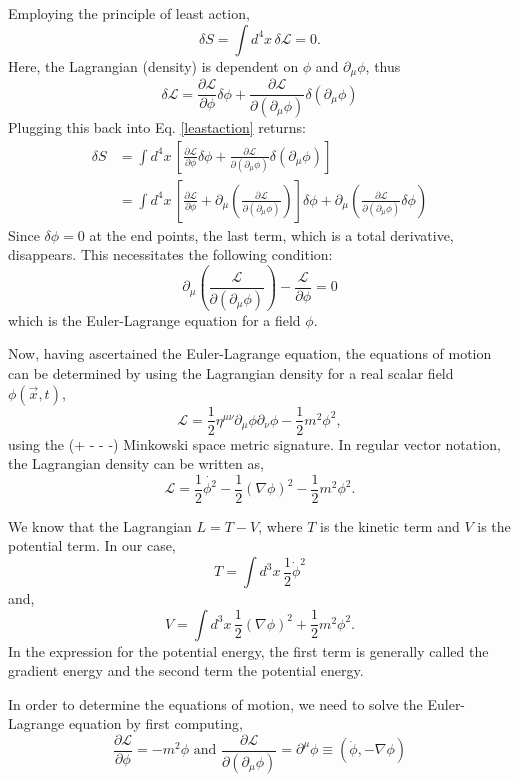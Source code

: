 \documentclass[12pt]{revtex4}
\begin{document}
Employing the principle of least action,
\begin{equation} \label{leastaction}
\delta S = \int d^4 x \, \delta \mathcal{L} = 0.
\end{equation}
Here, the Lagrangian (density) is dependent on $\phi$ and $\partial_{\mu} \phi$, thus
\[ \delta \mathcal{L} = \frac{\partial \mathcal{L}}{\partial \phi} \delta \phi + \frac{\partial \mathcal{L}}{\partial (\partial_{\mu} \phi)} \delta (\partial_{\mu} \phi)\]
Plugging this back into Eq. \ref{leastaction} returns:
\begin{align*}
\delta S &= \int d^4 x \, [\frac{\partial \mathcal{L}}{\partial \phi} \delta \phi + \frac{\partial \mathcal{L}}{\partial (\partial_{\mu} \phi)} \delta (\partial_{\mu} \phi)] \\
&= \int d^4 x \, [\frac{\partial \mathcal{L}}{\partial \phi} + \partial_{\mu}(\frac{\partial \mathcal{L}}{\partial (\partial_{\mu} \phi)})]\delta \phi + \partial_{\mu}(\frac{\partial \mathcal{L}}{\partial (\partial_{\mu} \phi)}\delta \phi)\end{align*} 
Since $\delta \phi = 0$ at the end points, the last term, which is a total derivative, disappears. This necessitates the following condition:
\[ \partial_{\mu}(\frac{\mathcal{L}}{\partial(\partial_{\mu}\phi)}) - \frac{\mathcal{L}}{\partial \phi} = 0\]
which is the Euler-Lagrange equation for a field $\phi$.

Now, having ascertained the Euler-Lagrange equation, the equations of motion can be determined by using the Lagrangian density for a real scalar field $\phi (\vec{x},t)$,
\[ \mathcal{L} = \dfrac{1}{2} \eta^{\mu\nu} \partial_{\mu} \phi \partial_{\nu} \phi - \dfrac{1}{2}m^2\phi^2,\]
using the (+ - - -) Minkowski space metric signature. In regular vector notation, the Lagrangian density can be written as,
\[ \mathcal{L} = \dfrac{1}{2} \dot{\phi^2} - \dfrac{1}{2}(\nabla \phi)^2 - \dfrac{1}{2}m^2\phi^2.\]

We know that the Lagrangian $L=T - V$, where $T$ is the kinetic term and $V$ is the potential term. In our case,
\[ T = \int d^3 x \, \frac{1}{2} \dot{\phi}^2 \]
and,
\[ V = \int d^3 x \, \frac{1}{2} (\nabla \phi)^2 + \frac{1}{2}m^2 \phi^2.\]
In the expression for the potential energy, the first term is generally called the gradient energy and the second term the potential energy.

In order to determine the equations of motion, we need to solve the Euler-Lagrange equation by first computing,
\[ \frac{\partial \mathcal{L}}{\partial \phi} = -m^2 \phi \text{  and  } \frac{\partial \mathcal{L}}{\partial (\partial_{\mu} \phi)} = \partial^{\mu}\phi \equiv (\dot{\phi},-\nabla\phi)\]
\end{document}
